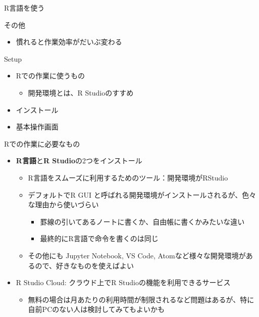 \documentclass[
  ignorenonframetext,
]{beamer}
\providecommand{\tightlist}{%
  \setlength{\itemsep}{0pt}\setlength{\parskip}{0pt}}
\begin{document}
\begin{frame}[fragile]{R言語を使う}
\begin{block}{その他}
\begin{itemize}
  \begin{itemize}
  \tightlist
  \item
    慣れると作業効率がだいぶ変わる
  \end{itemize}
\end{itemize}
\end{block}
\end{frame}

\begin{frame}[fragile]{Setup}
\protect\hypertarget{setup}{}
\begin{itemize}
\tightlist
\item
  Rでの作業に使うもの

  \begin{itemize}
  \tightlist
  \item
    開発環境とは、R Studioのすすめ
  \end{itemize}
\item
  インストール
\item
  基本操作画面
\end{itemize}

\begin{block}{Rでの作業に必要なもの}
\protect\hypertarget{rux3067ux306eux4f5cux696dux306bux5fc5ux8981ux306aux3082ux306e}{}
\begin{itemize}
\tightlist
\item
  \textbf{R言語}と\textbf{R Studio}の2つをインストール

  \begin{itemize}
  \tightlist
  \item
    R言語をスムーズに利用するためのツール：開発環境がRStudio
  \item
    デフォルトでR GUI
    と呼ばれる開発環境がインストールされるが、色々な理由から使いづらい

    \begin{itemize}
    \tightlist
    \item
      罫線の引いてあるノートに書くか、自由帳に書くかみたいな違い
    \item
      最終的にR言語で命令を書くのは同じ
    \end{itemize}
  \item
    その他にも Jupyter Notebook, VS Code,
    Atomなど様々な開発環境があるので、好きなものを使えばよい
  \end{itemize}
\item
  R Studio Cloud: クラウド上でR Studioの機能を利用できるサービス

  \begin{itemize}
  \tightlist
  \item
    無料の場合は月あたりの利用時間が制限されるなど問題はあるが、特に自前PCのない人は検討してみてもよいかも
  \end{itemize}
\end{itemize}
\end{block}


\end{frame}
\end{document}
